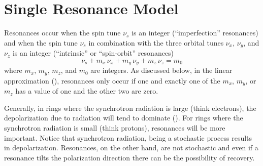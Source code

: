 \section{Single Resonance Model}
\label{s:spin.res}

Resonances occur when the spin tune $\nu_s$ is an integer (``imperfection'' resonances) and when the spin
tune $\nu_s$ in combination with the three orbital tunes $\nu_x$, $\nu_y$, and $\nu_z$ is an integer
(``intrinsic'' or ``spin-orbit'' resonances)
\begin{equation}
  \nu_s + m_x \, \nu_x + m_y \, \nu_y + m_z \, \nu_z = m_0
\end{equation}
where $m_x$, $m_y$, $m_z$, and $m_0$ are integers. As discussed below, 
in the linear approximation (),
resonances only occur if one and exactly one of the $m_x$, $m_y$, or $m_z$ has a value of one and
the other two are zero.

Generally, in rings where the synchrotron radiation is large (think electrons), the depolarization
due to radiation will tend to dominate (). For rings where the synchrotron radiation is
small (think protons), resonances will be more important. Notice that synchrotron radiation, being a
stochastic process results in depolarization. Resonances, on the other hand, are not stochastic and
even if a resonance tilts the polarization direction there can be the possibility of recovery.

